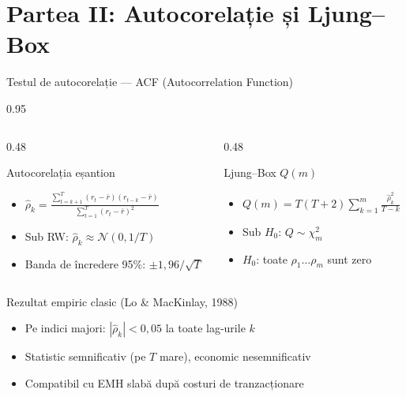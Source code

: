 \documentclass[9pt, aspectratio=169, t]{beamer}
\begin{document}
\section{Partea II: Autocorelație și Ljung--Box}

\begin{frame}[shrink=15]{Testul de autocorelație --- ACF (Autocorrelation Function)}
\begin{cminipage}{0.95\textwidth}
\begin{columns}[T]
\begin{column}{0.48\textwidth}
\begin{block}{Autocorelația eșantion}
\begin{itemize}\setlength{\itemsep}{0pt}
    \item $\hat\rho_k = \frac{\sum_{t=k+1}^{T}(r_t - \bar r)(r_{t-k} - \bar r)}{\sum_{t=1}^{T}(r_t - \bar r)^2}$
    \item Sub RW: $\hat\rho_k \approx \mathcal{N}(0, 1/T)$
    \item Banda de încredere 95\%: $\pm 1{,}96/\sqrt{T}$
\end{itemize}
\end{block}
\end{column}
\begin{column}{0.48\textwidth}
\begin{block}{Ljung--Box $Q(m)$}
\begin{itemize}\setlength{\itemsep}{0pt}
    \item $Q(m) = T(T+2)\sum_{k=1}^{m}\frac{\hat\rho_k^2}{T-k}$
    \item Sub $H_0$: $Q \sim \chi^2_m$
    \item $H_0$: toate $\rho_1 \ldots \rho_m$ sunt zero
\end{itemize}
\end{block}
\end{column}
\end{columns}

\vspace{0.15cm}
\begin{alertblock}{Rezultat empiric clasic (Lo \& MacKinlay, 1988)}
\begin{itemize}\setlength{\itemsep}{0pt}
    \item Pe indici majori: $|\hat\rho_k| < 0{,}05$ la toate lag-urile $k$
    \item Statistic semnificativ (pe $T$ mare), economic nesemnificativ
    \item Compatibil cu EMH slabă după costuri de tranzacționare
\end{itemize}
\end{alertblock}
\end{cminipage}
\end{frame}
\end{document}
